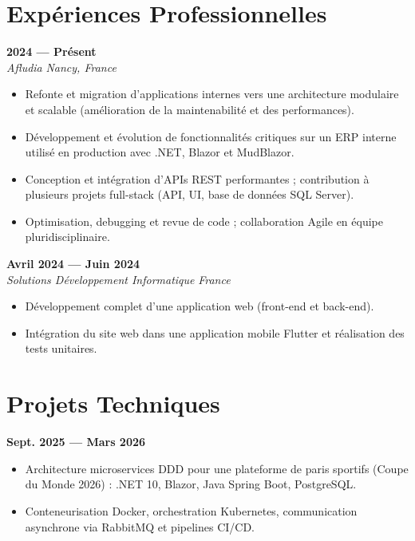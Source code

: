 \documentclass[10pt,a4paper]{article}
\begin{document}
\section*{Expériences Professionnelles}

 \hfill \textbf{2024 — Présent} \\
\textit{Afludia} \hfill \textit{Nancy, France}
\begin{itemize}[leftmargin=0.5cm, noitemsep, topsep=0pt, partopsep=0pt]
    \item Refonte et migration d'applications internes vers une architecture modulaire et scalable (amélioration de la maintenabilité et des performances).
    \item Développement et évolution de fonctionnalités critiques sur un ERP interne utilisé en production avec .NET, Blazor et MudBlazor.
    \item Conception et intégration d'APIs REST performantes ; contribution à plusieurs projets full-stack (API, UI, base de données SQL Server).
    \item Optimisation, debugging et revue de code ; collaboration Agile en équipe pluridisciplinaire.
\end{itemize}

\vspace{0.2cm}

 \hfill \textbf{Avril 2024 — Juin 2024} \\
\textit{Solutions Développement Informatique} \hfill \textit{France}
\begin{itemize}[leftmargin=0.5cm, noitemsep, topsep=0pt, partopsep=0pt]
    \item Développement complet d'une application web (front-end et back-end).
    \item Intégration du site web dans une application mobile Flutter et réalisation des tests unitaires.
\end{itemize}

\section*{Projets Techniques}

 \hfill \textbf{Sept. 2025 — Mars 2026}
\begin{itemize}[leftmargin=0.5cm, noitemsep, topsep=0pt, partopsep=0pt]
    \item Architecture microservices DDD pour une plateforme de paris sportifs (Coupe du Monde 2026) : .NET 10, Blazor, Java Spring Boot, PostgreSQL.
    \item Conteneurisation Docker, orchestration Kubernetes, communication asynchrone via RabbitMQ et pipelines CI/CD.
\end{itemize}
\end{document}
